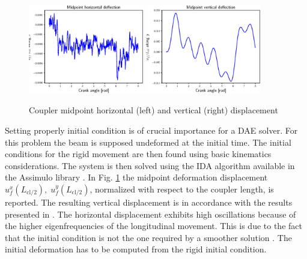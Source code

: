 \documentclass{svjour3}                     %
\begin{document}
\begin{figure}[tb]
	\centering
	\includegraphics[width=0.45\textwidth]{uM_disp.eps} 
	\includegraphics[width=0.45\textwidth]{wM_disp.eps} 
	\caption{Coupler midpoint horizontal (left) and vertical (right) displacement}
	\label{fig:defM_crsl}
\end{figure}

Setting properly initial condition is of crucial importance for a DAE solver. For this problem the beam is supposed undeformed at the initial time. The initial conditions for the rigid movement are then found using basic kinematics considerations.  The system is then solved using the IDA algorithm available in the Assimulo library \cite{assimulo}. In Fig. \ref{fig:defM_crsl} the midpoint deformation displacement $u_f^x(L_{\text{cl}/2}),\; u_f^y(L_{\text{cl}/2})$, normalized with respect to the coupler length, is reported. The resulting vertical displacement is in accordance with the results presented in \cite{Ellenbroek2018}. The horizontal displacement exhibits high oscillations because of the higher eigenfrequencies of the longitudinal movement. This is due to the fact that the initial condition is not the one required by a smoother solution \cite{MB_Daepde}. The initial deformation has to be computed from the rigid initial condition.
\end{document}
